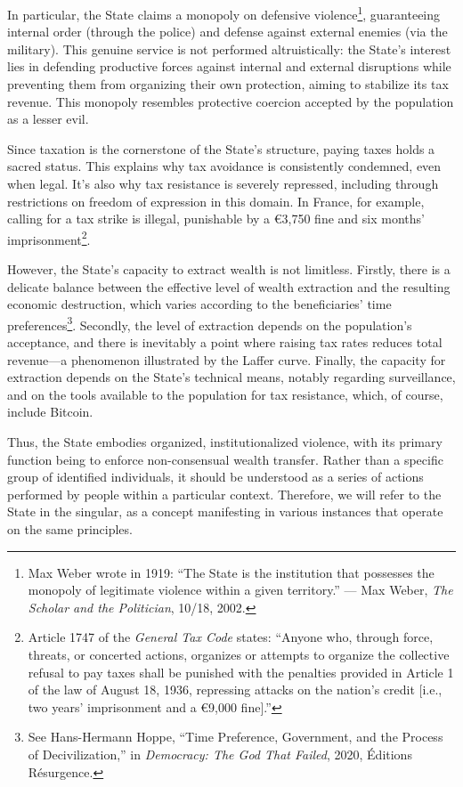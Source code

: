 \documentclass[
  a5paper,
  smalldemyvopaper,10pt,twoside,onecolumn,openright,extrafontsizes,hidelinks]{memoir}
\begin{document}
In particular, the State claims a monopoly on defensive
violence\footnote{Max Weber wrote in 1919: ``The State is the
  institution that possesses the monopoly of legitimate violence within
  a given territory.'' --- Max Weber, \emph{The Scholar and the
  Politician}, 10/18, 2002.}, guaranteeing internal order (through the
police) and defense against external enemies (via the military). This
genuine service is not performed altruistically: the State's interest
lies in defending productive forces against internal and external
disruptions while preventing them from organizing their own protection,
aiming to stabilize its tax revenue. This monopoly resembles protective
coercion accepted by the population as a lesser evil.

Since taxation is the cornerstone of the State's structure, paying taxes
holds a sacred status. This explains why tax avoidance is consistently
condemned, even when legal. It's also why tax resistance is severely
repressed, including through restrictions on freedom of expression in
this domain. In France, for example, calling for a tax strike is
illegal, punishable by a €3,750 fine and six months'
imprisonment\footnote{Article 1747 of the \emph{General Tax Code}
  states: ``Anyone who, through force, threats, or concerted actions,
  organizes or attempts to organize the collective refusal to pay taxes
  shall be punished with the penalties provided in Article 1 of the law
  of August 18, 1936, repressing attacks on the nation's credit {[}i.e.,
  two years' imprisonment and a €9,000 fine{]}.''}.

However, the State's capacity to extract wealth is not limitless.
Firstly, there is a delicate balance between the effective level of
wealth extraction and the resulting economic destruction, which varies
according to the beneficiaries' time preferences\footnote{See
  Hans-Hermann Hoppe, ``Time Preference, Government, and the Process of
  Decivilization,'' in \emph{Democracy: The God That Failed}, 2020,
  Éditions Résurgence.}. Secondly, the level of extraction depends on
the population's acceptance, and there is inevitably a point where
raising tax rates reduces total revenue---a phenomenon illustrated by
the Laffer curve. Finally, the capacity for extraction depends on the
State's technical means, notably regarding surveillance, and on the
tools available to the population for tax resistance, which, of course,
include Bitcoin.

Thus, the State embodies organized, institutionalized violence, with its
primary function being to enforce non-consensual wealth transfer. Rather
than a specific group of identified individuals, it should be understood
as a series of actions performed by people within a particular context.
Therefore, we will refer to the State in the singular, as a concept
manifesting in various instances that operate on the same principles.
\end{document}
